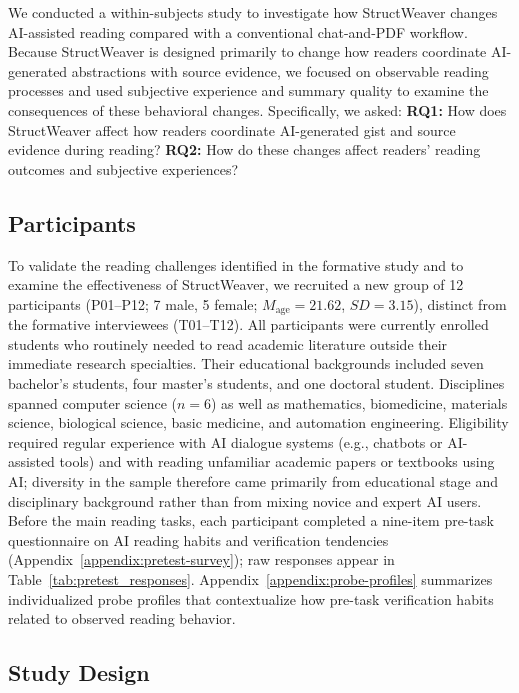 \documentclass[manuscript,review,anonymous]{acmart}
\begin{document}
We conducted a within-subjects study to investigate how StructWeaver changes AI-assisted reading compared with a conventional chat-and-PDF workflow. Because StructWeaver is designed primarily to change how readers coordinate AI-generated abstractions with source evidence, we focused on observable reading processes and used subjective experience and summary quality to examine the consequences of these behavioral changes. Specifically, we asked: \textbf{RQ1:} How does StructWeaver affect how readers coordinate AI-generated gist and source evidence during reading? \textbf{RQ2:} How do these changes affect readers' reading outcomes and subjective experiences?

\subsection{Participants}

To validate the reading challenges identified in the formative study and to examine the effectiveness of StructWeaver, we recruited a new group of 12 participants (P01--P12; 7 male, 5 female; $M_{\mathrm{age}}=21.62$, $SD=3.15$), distinct from the formative interviewees (T01--T12). All participants were currently enrolled students who routinely needed to read academic literature outside their immediate research specialties. Their educational backgrounds included seven bachelor's students, four master's students, and one doctoral student. Disciplines spanned computer science ($n=6$) as well as mathematics, biomedicine, materials science, biological science, basic medicine, and automation engineering. Eligibility required regular experience with AI dialogue systems (e.g., chatbots or AI-assisted tools) and with reading unfamiliar academic papers or textbooks using AI; diversity in the sample therefore came primarily from educational stage and disciplinary background rather than from mixing novice and expert AI users. Before the main reading tasks, each participant completed a nine-item pre-task questionnaire on AI reading habits and verification tendencies (Appendix~\ref{appendix:pretest-survey}); raw responses appear in Table~\ref{tab:pretest_responses}. Appendix~\ref{appendix:probe-profiles} summarizes individualized probe profiles that contextualize how pre-task verification habits related to observed reading behavior.

\subsection{Study Design}
\end{document}
